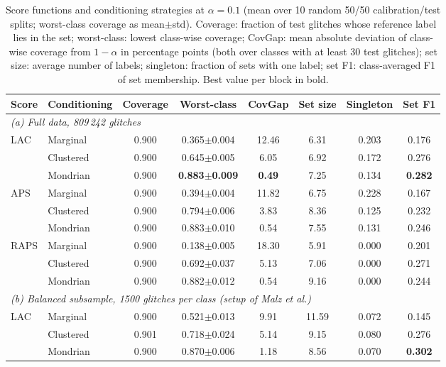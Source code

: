 \begin{table}[!t]
\caption{Score functions and conditioning strategies at $\alpha=0.1$ (mean over 10 random 50/50 calibration/test splits;
worst-class coverage as mean$\pm$std). Coverage: fraction of test glitches whose reference label lies in the set; worst-class:
lowest class-wise coverage; CovGap: mean absolute deviation of class-wise coverage from $1-\alpha$ in percentage points (both over
classes with at least 30 test glitches); set size: average number of labels; singleton: fraction of sets with one label; set F1:
class-averaged F1 of set membership. Best value per block in bold.}\label{tab:e1}
\centering\small\setlength{\tabcolsep}{7pt}
\begin{adjustbox}{max width=\textwidth}\begin{tabular}{llcccccc}\toprule
Score & Conditioning & Coverage & Worst-class & CovGap & Set size & Singleton & Set F1\\\midrule
\multicolumn{8}{l}{\emph{(a) Full data, 809\,242 glitches}}\\
LAC & Marginal & 0.900 & 0.365$\pm$0.004 & 12.46 & 6.31 & 0.203 & 0.176\\
 & Clustered & 0.900 & 0.645$\pm$0.005 & 6.05 & 6.92 & 0.172 & 0.276\\
 & Mondrian & 0.900 & \textbf{0.883$\pm$0.009} & \textbf{0.49} & 7.25 & 0.134 & \textbf{0.282}\\
\addlinespace[2pt]
APS & Marginal & 0.900 & 0.394$\pm$0.004 & 11.82 & 6.75 & 0.228 & 0.167\\
 & Clustered & 0.900 & 0.794$\pm$0.006 & 3.83 & 8.36 & 0.125 & 0.232\\
 & Mondrian & 0.900 & 0.883$\pm$0.010 & 0.54 & 7.55 & 0.131 & 0.246\\
\addlinespace[2pt]
RAPS & Marginal & 0.900 & 0.138$\pm$0.005 & 18.30 & 5.91 & 0.000 & 0.201\\
 & Clustered & 0.900 & 0.692$\pm$0.037 & 5.13 & 7.06 & 0.000 & 0.271\\
 & Mondrian & 0.900 & 0.882$\pm$0.012 & 0.54 & 9.16 & 0.000 & 0.244\\
\midrule
\multicolumn{8}{l}{\emph{(b) Balanced subsample, 1500 glitches per class (setup of Malz et al.)}}\\
LAC & Marginal & 0.900 & 0.521$\pm$0.013 & 9.91 & 11.59 & 0.072 & 0.145\\
 & Clustered & 0.901 & 0.718$\pm$0.024 & 5.14 & 9.15 & 0.080 & 0.276\\
 & Mondrian & 0.900 & 0.870$\pm$0.006 & 1.18 & 8.56 & 0.070 & \textbf{0.302}\\

\end{tabular}
\end{adjustbox}
\end{table}
